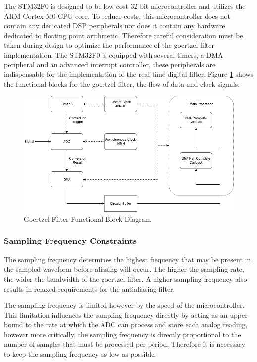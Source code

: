 The STM32F0 is designed to be low cost 32-bit microcontroller and utilizes the ARM Cortex-M0 CPU core. To reduce costs, this microcontroller does not contain any dedicated DSP peripherals nor does it contain any hardware dedicated to floating point arithmetic. Therefore careful consideration must be taken during design to optimize the performance of the goertzel filter implementation. The STM32F0 is equipped with several timers, a DMA peripheral and an advanced interrupt controller, these peripherals are indispensable for the implementation of the real-time digital filter. Figure \ref{fig:goertzel_functional_diagram} shows the functional blocks for the goertzel filter, the flow of data and clock signals.

\begin{figure}[H]
	\centering
	\includegraphics[width=.8\textwidth]{figures/design/goertzel_filter_functional.png}
	\caption{Goertzel Filter Functional Block Diagram}
	\label{fig:goertzel_functional_diagram}
\end{figure}

\subsubsection{Sampling Frequency Constraints}
\label{sec:sampling_frequency_constraints}
The sampling frequency determines the highest frequency that may be present in the sampled waveform before aliasing will occur. The higher the sampling rate, the wider the bandwidth of the goertzel filter. A higher sampling frequency also results in relaxed requirements for the antialiasing filter.

The sampling frequency is limited however by the speed of the microcontroller. This limitation influences the sampling frequency directly by acting as an upper bound to the rate at which the ADC can process and store each analog reading, however more critically, the sampling frequency is directly proportional to the number of samples that must be processed per period. Therefore it is necessary to keep the sampling frequency as low as possible.

